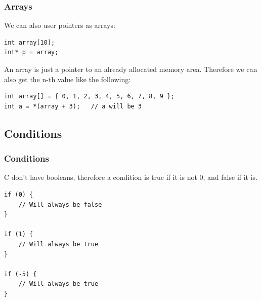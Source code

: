 \documentclass[
	11pt, %
]{beamer}
\begin{document}
\begin{frame}[fragile]
	\frametitle{Arrays}

    We can also user pointers as arrays:

    \begin{lstlisting}[style=CStyle]
int array[10];
int* p = array;

\end{lstlisting}

    \bigskip

    An array is just a pointer to an already allocated memory area. Therefore we can also get the n-th value like the following:

    \begin{lstlisting}[style=CStyle]
int array[] = { 0, 1, 2, 3, 4, 5, 6, 7, 8, 9 };
int a = *(array + 3);   // a will be 3

\end{lstlisting}

\end{frame}

\begin{frame}[fragile]
    \subsection{Conditions}
	\frametitle{Conditions}

    C don't have booleans, therefore a condition is true if it is not 0, and false if it is.

    \bigskip

    \begin{lstlisting}[style=CStyle]
if (0) {
    // Will always be false
}

if (1) {
    // Will always be true
}

if (-5) {
    // Will always be true
}

\end{lstlisting}

\end{frame}
\end{document}
